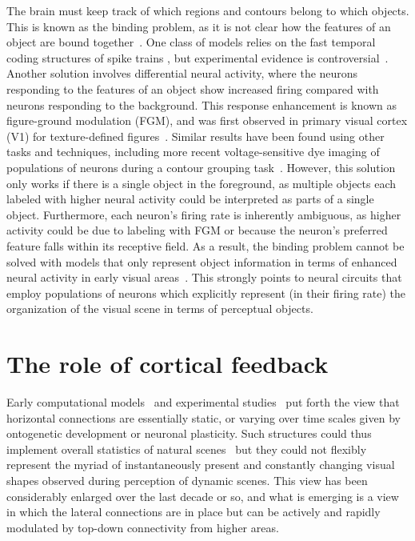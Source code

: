 The brain must keep track of which regions and contours belong to which objects. This is known as the binding problem, as it is not clear how the features of an object are bound together~\citep{Treisman96b}. One class of models relies on the fast temporal coding structures of spike trains \citep{Singer99b}, but experimental evidence is controversial~\citep{Thiele_Stoner03,Roelfsema_etal04,Dong_etal08a}. Another solution involves differential neural activity, where the neurons responding to the features of an object show increased firing compared with neurons responding to the background. This response enhancement is known as figure-ground modulation (FGM), and was first observed in primary visual cortex (V1) for texture-defined figures~\citep{Lamme95}. Similar results have been found using other tasks and techniques, including more recent voltage-sensitive dye imaging of populations of neurons during a contour grouping task~\citep{Gilad_etal13}. However, this solution only works if there is a single object in the foreground, as multiple objects each labeled with higher neural activity could be interpreted as parts of a single object. Furthermore, each neuron's firing rate is inherently ambiguous, as higher activity could be due to labeling with FGM or because the neuron's preferred feature falls within its receptive field. As a result, the binding problem cannot be solved with models that only represent object information in terms of enhanced neural activity in early visual areas~\citep{Niebur00a}. This strongly points to neural circuits that employ populations of neurons which explicitly represent (\ie in their firing rate) the organization of the visual scene in terms of perceptual objects.

\section{The role of cortical feedback}
%
Early computational models~\citep{Stemmler_etal95b} and experimental studies~\citep{Simonotto_etal97,Polat_etal98,Chatterjee_etal11,Xie_etal14} put forth the view that horizontal connections
are essentially static, or varying over time scales given by ontogenetic development or neuronal plasticity. Such structures could thus implement overall statistics of natural scenes~\citep[like circular structures, e.g.][]{Sigman_etal01} but they could not flexibly represent the myriad of instantaneously present and constantly changing visual shapes observed during perception of dynamic scenes. This view has been considerably enlarged over the last decade or so, and what is emerging is a view in which the lateral connections are in place but can be actively and rapidly modulated by top-down connectivity from higher areas.

